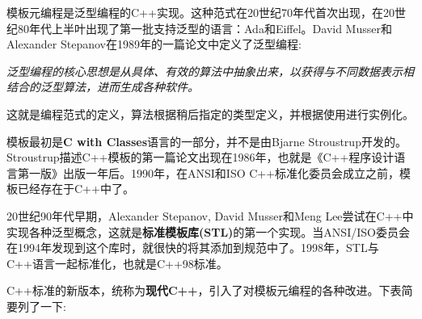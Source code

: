模板元编程是泛型编程的C++实现。这种范式在20世纪70年代首次出现，在20世纪80年代上半叶出现了第一批支持泛型的语言：Ada和Eiffel。David Musser和Alexander Stepanov在1989年的一篇论文中定义了泛型编程:

\begin{center}
\textit{
泛型编程的核心思想是从具体、有效的算法中抽象出来，以获得与不同数据表示相结合的泛型算法，进而生成各种软件。
}
\end{center}

这就是编程范式的定义，算法根据稍后指定的类型定义，并根据使用进行实例化。

模板最初是\textbf{C with Classes}语言的一部分，并不是由Bjarne Stroustrup开发的。Stroustrup描述C++模板的第一篇论文出现在1986年，也就是《C++程序设计语言第一版》出版一年后。1990年，在ANSI和ISO C++标准化委员会成立之前，模板已经存在于C++中了。

20世纪90年代早期，Alexander Stepanov, David Musser和Meng Lee尝试在C++中实现各种泛型概念，这就是\textbf{标准模板库(STL)}的第一个实现。当ANSI/ISO委员会在1994年发现到这个库时，就很快的将其添加到规范中了。1998年，STL与C++语言一起标准化，也就是C++98标准。

C++标准的新版本，统称为\textbf{现代C++}，引入了对模板元编程的各种改进。下表简要列了一下:

